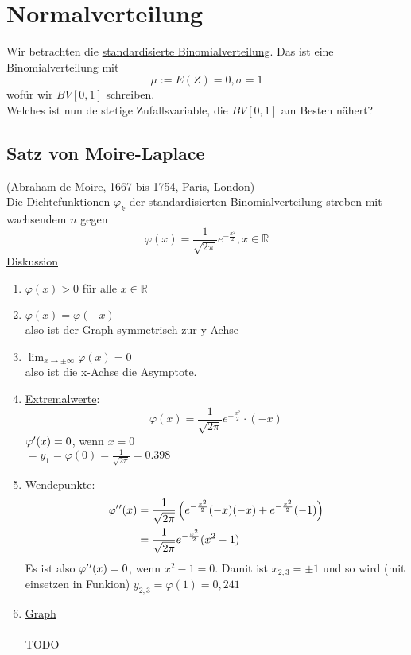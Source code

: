 \documentclass{report}
\begin{document}
\newpage

\section{Normalverteilung}
Wir betrachten die \underline{standardisierte Binomialverteilung}. Das ist eine Binomialverteilung mit
\begin{equation}
\mu := E(Z) = 0, \sigma = 1
\end{equation}
wofür wir $BV[0,1]$ schreiben.\\
Welches ist nun de stetige Zufallsvariable, die $BV[0,1]$ am Besten nähert?
\subsection{Satz von Moire-Laplace}
(Abraham de Moire, 1667 bis 1754, Paris, London)\\
Die Dichtefunktionen $\varphi_k$ der standardisierten Binomialverteilung streben mit wachsendem $n$ gegen
\begin{equation}
\varphi(x) = \frac{1}{\sqrt{2 \pi}} e^{- \frac{x^2}{2}}, x \in \mathbb{R}
\end{equation}
\underline{Diskussion}\\
\begin{enumerate}
\item
$\varphi(x) > 0$ für alle $x \in \mathbb{R}$
\item
$\varphi(x) = \varphi(-x)$\\
also ist der Graph symmetrisch zur y-Achse
\item
$\lim_{x \to \pm \infty}{\varphi(x) = 0}$\\
also ist die x-Achse die Asymptote.
\item
\underline{Extremalwerte}:
\begin{equation}
\varphi(x) = \frac{1}{\sqrt{2 \pi}} e^{-\frac{x^2}{2}} \cdot (-x)
\end{equation}
$\varphi\rq{}(x) = 0$, wenn $x=0$\\
$= y_1 = \varphi(0) = \frac{1}{\sqrt{2 \pi}} = 0.398$
\item
\underline{Wendepunkte}:
\begin{align*}
\varphi\rq{}\rq{}(x) &= \frac{1}{\sqrt{2 \pi}} \left(e^{-\frac{x^2}{2}}(-x)(-x) + e^{-\frac{x^2}{2}}(-1)\right)\\
&= \frac{1}{\sqrt{2 \pi}} e^{-\frac{x^2}{2}} (x^2 - 1)
\end{align*}
Es ist also $\varphi\rq{}\rq{}(x) = 0$, wenn $x^2 -1 = 0$. Damit ist $x_{2,3} = \pm 1$ und so wird (mit einsetzen in Funkion) $y_{2,3} = \varphi(1) = 0,241$
\item
\underline{Graph}
\\\\TODO\\\\

\end{enumerate}
\end{document}
